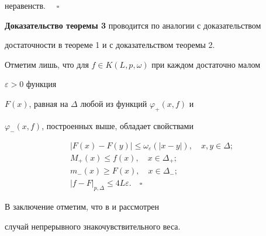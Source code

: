 неравенств. $\quad\square$


\medskip





{\bf Доказательство теоремы 3} проводится по аналогии с доказательством


достаточности в теореме 1 и с доказательством теоремы 2.





Отметим лишь, что для $f\in K(L,p,\omega)$ при каждом достаточно малом


$\varepsilon>0$ функция


$F(x)$, равная на $\Delta$ любой из функций $\varphi_+(x,f)$ и


$\varphi_-(x,f)$, построенных выше, обладает свойствами


\begin{gather*}


|F(x)-F(y)|\le\omega_\varepsilon(|x-y|),\quad x,y\in\Delta;\\


M_+(x)\le f(x),\quad x\in\Delta_+;\\


m_-(x)\ge F(x),\quad x\in\Delta_-;\\


|f-F|_{p,\Delta}\le 4L\varepsilon.\quad\square


\end{gather*}





В заключение отметим, что в \cite{6} и \cite{8} рассмотрен


случай непрерывного знакочувствительного веса.






